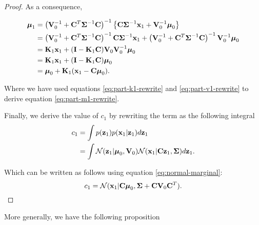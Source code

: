 \documentclass[11pt]{article}
\numberwithin{equation}{section}
\newcommand{\x}{{\bf x}}
\newcommand{\z}{{\bf z}}
\newcommand{\N}{\mathcal{N}}
\begin{document}
\begin{proof}
	As a consequence,

	\begin{align}
		\boldsymbol{\mu}_1 &= \left({\bf V}_0^{-1} + {\bf C}^T\boldsymbol{\Sigma}^{-1} {\bf C}\right)^{-1} \left\{{\bf C}\boldsymbol\Sigma^{-1}\x_1 + {\bf V}_0^{-1}\boldsymbol\mu_0\right\}\\
		&= \left({\bf V}_0^{-1} + {\bf C}^T\boldsymbol{\Sigma}^{-1} {\bf C}\right)^{-1} {\bf C}\boldsymbol\Sigma^{-1}\x_1 + \left({\bf V}_0^{-1} + {\bf C}^T\boldsymbol{\Sigma}^{-1} {\bf C}\right)^{-1} {\bf V}_0^{-1}\boldsymbol\mu_0\\
		&= {\bf K}_1\x_1 + ({\bf I} - {\bf K}_1{\bf C}){\bf V}_0 {\bf V}_0^{-1}\boldsymbol\mu_0 \label{eq:part-m1-rewrite}\\
		&= {\bf K}_1\x_1 + ({\bf I} - {\bf K}_1{\bf C})\boldsymbol\mu_0 \\
		&= \boldsymbol{\mu}_0 + {\bf K}_1(\x_1 -{\bf C}\boldsymbol\mu_0).
	\end{align}
	
	Where we have used equations \eqref{eq:part-k1-rewrite} and \eqref{eq:part-v1-rewrite} to derive equation \eqref{eq:part-m1-rewrite}.
	
	Finally, we derive the value of $c_1$ by rewriting the term as the following integral
	\begin{align}
		c_1 &= \int p(\z_1) p (\x_1 \vert \z_1) d\z_1\\
			&= \int \N(\z_1\vert \boldsymbol\mu_0, {\bf V}_0) \N(\x_1 \vert {\bf C}\z_1, \boldsymbol\Sigma) d\z_1.
	\end{align}
	
	Which can be written as follows using equation \eqref{eq:normal-marginal}:
	\begin{equation}
		c_1 = \N(\x_1 \vert {\bf C}\boldsymbol\mu_0, \boldsymbol\Sigma + {\bf C}{\bf V}_0 {\bf C}^T).
	\end{equation}
\end{proof}


More generally, we have the following proposition
\end{document}
